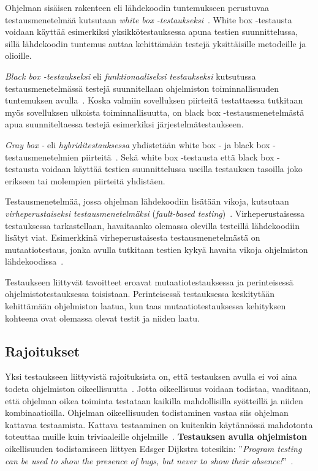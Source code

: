 \documentclass[finnish, grading]{tktltiki2}
\theoremstyle{definition}
\theoremstyle{remark}
\begin{document}
Ohjelman sisäisen rakenteen eli lähdekoodin tuntemukseen perustuvaa testausmenetelmää kutsutaan \textit{white box -testaukseksi}~\cite[s. 52]{Binder:1999}. White box -testausta voidaan käyttää esimerkiksi yksikkötestauksessa apuna testien suunnittelussa, sillä lähdekoodin tuntemus auttaa kehittämään testejä yksittäisille metodeille ja olioille.

\textit{Black box -testaukseksi} eli \textit{funktionaaliseksi testaukseksi} kutsutussa testausmenetelmässä testejä suunnitellaan ohjelmiston toiminnallisuuden tuntemuksen avulla~\cite[s. 51-52]{Binder:1999}. Koska valmiin sovelluksen piirteitä testattaessa tutkitaan myös sovelluksen ulkoista toiminnallisuutta, on black box -testausmenetelmästä apua suunniteltaessa testejä esimerkiksi järjestelmätestaukseen.

\textit{Gray box -} eli \textit{hybriditestauksessa} yhdistetään white box - ja black box -testausmenetelmien piirteitä~\cite[s. 52]{Binder:1999}. Sekä white box -testausta että black box -testausta voidaan käyttää testien suunnittelussa useilla testauksen tasoilla joko erikseen tai molempien piirteitä yhdistäen.

Testausmenetelmää, jossa ohjelman lähdekoodiin lisätään vikoja, kutsutaan \textit{virheperustaiseksi testausmenetelmäksi} (\textit{fault-based testing})~\cite[s. 52]{Binder:1999}. Virheperustaisessa testauksessa tarkastellaan, havaitaanko olemassa olevilla testeillä lähdekoodiin lisätyt viat. Esimerkkinä virheperustaisesta testausmenetelmästä on mutaatiotestaus, jonka avulla tutkitaan testien kykyä havaita vikoja ohjelmiston lähdekoodissa~\cite[s. 36]{DeMillo:Lipton:Sayward:1978}. 

Testaukseen liittyvät tavoitteet eroavat mutaatiotestauksessa ja perinteisessä ohjelmistotestauksessa toisistaan. Perinteisessä testauksessa keskitytään kehittämään ohjelmiston laatua, kun taas mutaatiotestauksessa kehityksen kohteena ovat olemassa olevat testit ja niiden laatu.

\subsection{Rajoitukset}

Yksi testaukseen liittyvistä rajoituksista on, että testauksen avulla ei voi aina todeta ohjelmiston oikeellisuutta~\cite[s. 58]{Binder:1999}. Jotta oikeellisuus voidaan todistaa, vaaditaan, että ohjelman oikea toiminta testataan kaikilla mahdollisilla syötteillä ja niiden kombinaatioilla. Ohjelman oikeellisuuden todistaminen vastaa siis ohjelman kattavaa testaamista. Kattava testaaminen on kuitenkin käytännössä mahdotonta toteuttaa muille kuin triviaaleille ohjelmille~\cite[s. 58]{Binder:1999}. \textbf{Testauksen avulla ohjelmiston} oikellisuuden todistamiseen liittyen Edsger Dijkstra totesikin: ''\textit{Program testing can be used to show the presence of bugs, but never to show their absence!}''~\cite[s. 6]{Dahl:Dijkstra:Hoare:1972}.
\end{document}
